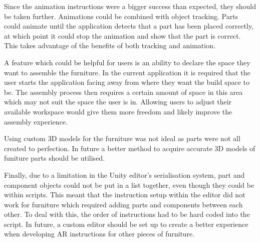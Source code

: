 \documentclass{l4proj}
\begin{document}
Since the animation instructions were a bigger success than expected, they should be taken further. Animations could be combined with object tracking. Parts could animate until the application detects that a part has been placed correctly, at which point it could stop the animation and show that the part is correct. This takes advantage of the benefits of both tracking and animation.

A feature which could be helpful for users is an ability to declare the space they want to assemble the furniture. In the current application it is required that the user starts the application facing away from where they want the build space to be. The assembly process then requires a certain amount of space in this area which may not suit the space the user is in. Allowing users to adjust their available workspace would give them more freedom and likely improve the assembly experience.

Using custom 3D models for the furniture was not ideal as parts were not all created to perfection. In future a better method to acquire accurate 3D models of funiture parts should be utilised.

Finally, due to a limitation in the Unity editor's serialisation system, part and component objects could not be put in a list together, even though they could be within scripts. This meant that the instruction setup within the editor did not work for furniture which required adding parts and components between each other. To deal with this, the order of instructions had to be hard coded into the script. In future, a custom editor should be set up to create a better experience when developing AR instructions for other pieces of furniture.

%
% 
\end{document}
